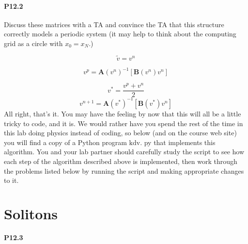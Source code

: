 \documentclass{book}
\theoremstyle{plain}
\theoremstyle{definition}
\numberwithin{exm}{chapter}
\theoremstyle{remark}
\theoremstyle{summary}
\theoremstyle{overview}
\begin{document}
\paragraph*{P12.2}Discuss these matrices with a TA and convince the TA that this structure correctly models a periodic system (it may help to think about the computing grid as a circle with $x_{0}=x_{N}$.)

\begin{equation}\label{eq:1210}
\tilde{v}=v^{n}
\end{equation}


\begin{equation}\label{eq:1211}
v^{p}=\mathbf{A}\left(v^{n}\right)^{-1}\left[\mathbf{B}\left(v^{n}\right) v^{n}\right]
\end{equation}

\begin{equation}\label{eq:1212}
v^{*}=\frac{v^{p}+v^{n}}{2}
\end{equation}
\begin{equation}\label{eq:1213}
v^{n+1}=\mathbf{A}\left(v^{*}\right)^{-1}\left[\mathbf{B}\left(v^{*}\right) v^{n}\right]
\end{equation}
All right, that\rq s it. You may have the feeling by now that this will all be a little tricky to code, and it is. We would rather have you spend the rest of the time in this lab doing physics instead of coding, so below (and on the course web site) you will find a copy of a Python program $\mathrm{kdv}$. py that implements this algorithm. You and your lab partner should carefully study the script to see how each step of the algorithm described above is implemented, then work through the problems listed below by running the script and making appropriate changes to it.

\section*{Solitons}
\paragraph*{P12.3}
\end{document}
